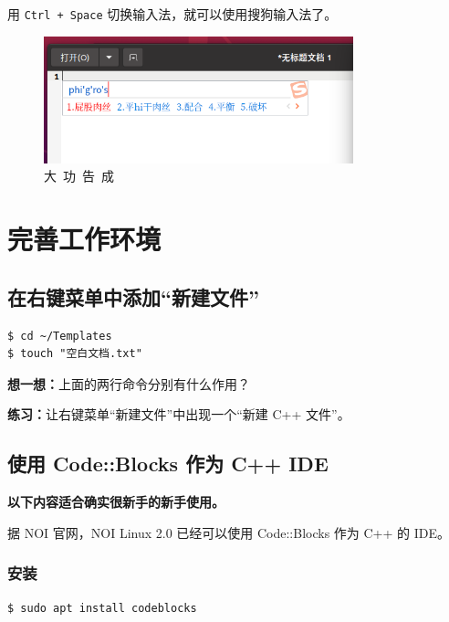 \documentclass[UTF-8]{ctexart}
\begin{document}
				用 \texttt{Ctrl + Space} 切换输入法，就可以使用搜狗输入法了。
				
				\begin{figure}[H]
					\centering
					\includegraphics[width=0.8\textwidth]{fig/sogou_success.png}
					\caption*{大~功~告~成}
				\end{figure}
				
	\newpage
				
	\section{完善工作环境}
	
		\subsection{在右键菜单中添加“新建文件”}
		
			\begin{verbatim}
$ cd ~/Templates
$ touch "空白文档.txt"
			\end{verbatim}
		
			\textbf{想一想：}上面的两行命令分别有什么作用？
			
			\textbf{练习：}让右键菜单“新建文件”中出现一个“新建 C++ 文件”。
	
	
		\subsection{使用 Code::Blocks 作为 C++ IDE}
		
			\textbf{以下内容适合确实很新手的新手使用。}
		
			据 NOI 官网，NOI Linux 2.0 已经可以使用 Code::Blocks 作为 C++ 的 IDE。
			
			\subsubsection{安装}
		
				\begin{verbatim}
$ sudo apt install codeblocks
				\end{verbatim}
			
\end{document}
